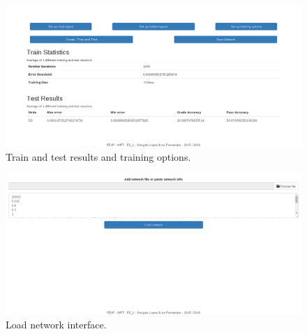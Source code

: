 \documentclass[11pt]{article}
\begin{document}
\begin{figure}[H]
\label{fig:example}
\includegraphics[scale=0.3]{interface2.png}
\centering
\caption{Train and test results and training options.}
\end{figure}

\begin{figure}[H]
\label{fig:example}
\includegraphics[scale=0.3]{interface3.png}
\centering
\caption{Load network interface.}
\end{figure}
\end{document}
